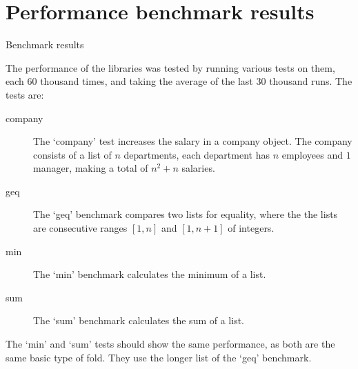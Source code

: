 \section{Performance benchmark results}

\begin{table}[ht]

\caption{Benchmark results}
\label{bench}
\end{table}

The performance of the libraries was tested by running various tests on them,
each 60 thousand times, and taking the average of the last 30 thousand runs.
The tests are:

\begin{description}
    \item[company]The `company' test increases the salary in a company
object. The company consists of a list of $n$ departments, each department has
$n$ employees and $1$ manager, making a total of $n^{2} + n$ salaries.

    \item[geq] The `geq' benchmark compares two lists for equality, where the
               the lists are consecutive ranges $[1, n]$ and $[1, n+1]$ of
               integers.

    \item[min] The `min' benchmark calculates the minimum of a list.

    \item[sum] The `sum' benchmark calculates the sum of a list.
\end{description}

The `min' and `sum' tests should show the same performance, as both are the
same basic type of fold. They use the longer list of the `geq' benchmark.
